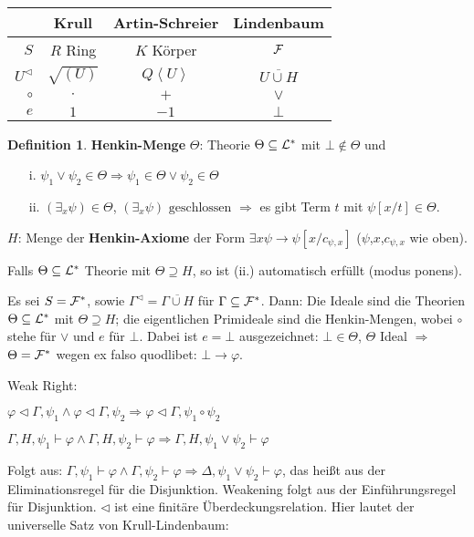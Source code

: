 \documentclass[headsepline=true,DIV=11]{scrartcl}
\theoremstyle{definition}
\newtheorem*{definition}{Definition}
\renewcommand{\bar}[1]{\overline{#1}}
\begin{document}
\begin{center}
\begin{tabular}{r||c|c|c}
        & Krull        & Artin-Schreier    & Lindenbaum \\ \hline
$S$     & $R$ Ring     & $K$ Körper        & $\cal F$ \\
$U^\lhd$ & $\sqrt{(U)}$ & $Q\left<U\right>$ & $\bar{U\cup H}$ \\
$\circ$ & $\cdot$      & $+$               & $\vee$ \\
$e$     & $1$          & $-1$              & $\bot$
\end{tabular}
\end{center}

\begin{definition}
  {\bf Henkin-Menge} $\Theta$: Theorie $\Theta\subseteq{\cal L}^*$ mit $\bot\not\in\Theta$ und
  \begin{itemize}
    \item[i.] $\psi_1\vee\psi_2\in\Theta\Rightarrow \psi_1\in\Theta \vee \psi_2\in\Theta$
    \item[ii.] $(\exists_{x}\psi)\in\Theta$, $(\exists_x\psi)\mbox{ geschlossen}$ $\Rightarrow$ es gibt Term $t$ mit $\psi[x/t]\in\Theta$.
  \end{itemize}
\end{definition}

$H$: Menge der {\bf Henkin-Axiome} der Form $\exists x \psi\rightarrow\psi[x/c_{\psi,x}]$ ($\psi$,$x$,$c_{\psi,x}$ wie oben).

Falls $\Theta\subseteq{\cal L}^*$ Theorie mit $\Theta\supseteq H$, so ist (ii.) automatisch erfüllt (modus ponens).

Es sei $S={\cal F}^*$, sowie $\Gamma^\lhd=\bar{\Gamma\cup H}$ für $\Gamma\subseteq{\cal F}^*$. Dann: Die Ideale sind die Theorien
$\Theta\subseteq{\cal L}^*$ mit $\Theta\supseteq H$; die eigentlichen Primideale sind die Henkin-Mengen, wobei $\circ$ stehe für $\vee$ und $e$ für
$\bot$. Dabei ist $e=\bot$ ausgezeichnet: $\bot\in\Theta$, $\Theta$ Ideal $\Rightarrow$ $\Theta={\cal F}^*$ wegen ex falso quodlibet:
$\bot\rightarrow\varphi$.

Weak Right:

$\varphi\lhd\Gamma,\psi_1\wedge\varphi\lhd\Gamma,\psi_2\Rightarrow\varphi\lhd\Gamma,\psi_1\circ\psi_2$

$\Gamma,H,\psi_1\vdash\varphi \wedge \Gamma,H,\psi_2\vdash\varphi\Rightarrow\Gamma,H,\psi_1\vee\psi_2\vdash\varphi$

Folgt aus: $\Gamma,\psi_1\vdash\varphi \wedge \Gamma,\psi_2\vdash\varphi\Rightarrow\Delta,\psi_1\vee\psi_2\vdash\varphi$, das heißt aus der
Eliminationsregel für die Disjunktion. Weakening folgt aus der Einführungsregel für Disjunktion. $\lhd$ ist eine finitäre Überdeckungsrelation. Hier
lautet der universelle Satz von Krull-Lindenbaum:
\end{document}
